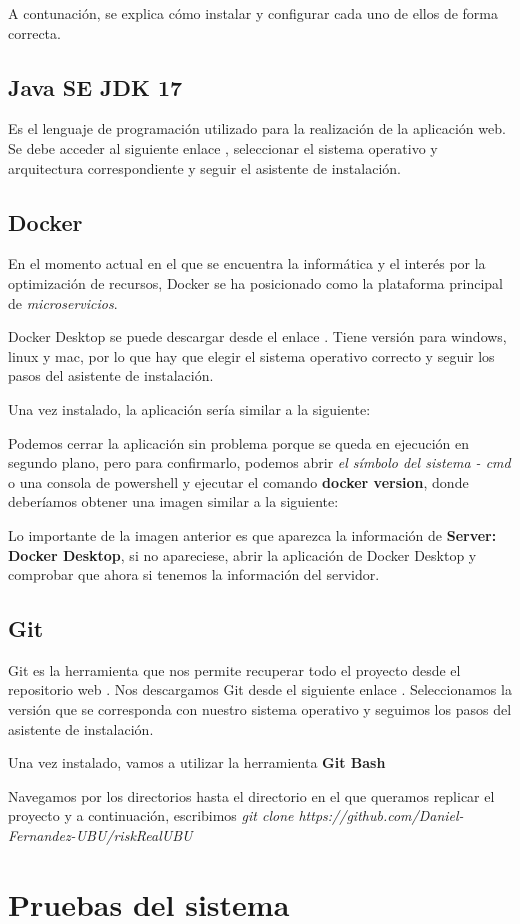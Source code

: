 A contunación, se explica cómo instalar y configurar cada uno de ellos de forma correcta.

\subsection{Java SE JDK 17}

Es el lenguaje de programación utilizado para la realización de la aplicación web.
Se debe acceder al siguiente enlace \cite{web:JavaJDK}, seleccionar el sistema operativo y arquitectura correspondiente y seguir el asistente de instalación.

\subsection{Docker}

En el momento actual en el que se encuentra la informática y el interés por la optimización de recursos, Docker se ha posicionado como la plataforma principal de \textit{microservicios}.

Docker Desktop se puede descargar desde el enlace \cite{web:dockerDesktop}. Tiene versión para windows, linux y mac, por lo que hay que elegir el sistema operativo correcto y seguir los pasos del asistente de instalación.

Una vez instalado, la aplicación sería similar a la siguiente:

Podemos cerrar la aplicación sin problema porque se queda en ejecución en segundo plano, pero para confirmarlo, podemos abrir \textit{el símbolo del sistema - cmd} o una consola de powershell y ejecutar el comando \textbf{docker version}, donde deberíamos obtener una imagen similar a la siguiente:

Lo importante de la imagen anterior es que aparezca la información de \textbf{Server: Docker Desktop}, si no apareciese, abrir la aplicación de Docker Desktop y comprobar que ahora si tenemos la información del servidor.

\subsection{Git}

Git es la herramienta que nos permite recuperar todo el proyecto desde el repositorio web \cite{github:proyect}. 
Nos descargamos Git desde el siguiente enlace \cite{web:git}.
Seleccionamos la versión que se corresponda con nuestro sistema operativo y seguimos los pasos del asistente de instalación.

Una vez instalado, vamos a utilizar la herramienta \textbf{Git Bash}

Navegamos por los directorios hasta el directorio en el que queramos replicar el proyecto y a continuación, escribimos \textit{git clone https://github.com/Daniel-Fernandez-UBU/riskRealUBU}


\section{Pruebas del sistema}
